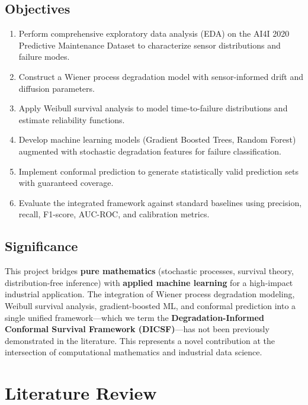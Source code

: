 \documentclass[12pt, a4paper]{article}
\begin{document}
\subsection{Objectives}

\begin{enumerate}
    \item Perform comprehensive exploratory data analysis (EDA) on the AI4I 2020 Predictive Maintenance Dataset to characterize sensor distributions and failure modes.
    \item Construct a Wiener process degradation model with sensor-informed drift and diffusion parameters.
    \item Apply Weibull survival analysis to model time-to-failure distributions and estimate reliability functions.
    \item Develop machine learning models (Gradient Boosted Trees, Random Forest) augmented with stochastic degradation features for failure classification.
    \item Implement conformal prediction to generate statistically valid prediction sets with guaranteed coverage.
    \item Evaluate the integrated framework against standard baselines using precision, recall, F1-score, AUC-ROC, and calibration metrics.
\end{enumerate}

\subsection{Significance}

This project bridges \textbf{pure mathematics} (stochastic processes, survival theory, distribution-free inference) with \textbf{applied machine learning} for a high-impact industrial application. The integration of Wiener process degradation modeling, Weibull survival analysis, gradient-boosted ML, and conformal prediction into a single unified framework---which we term the \textbf{Degradation-Informed Conformal Survival Framework (DICSF)}---has not been previously demonstrated in the literature. This represents a novel contribution at the intersection of computational mathematics and industrial data science.


\section{Literature Review}
\end{document}
